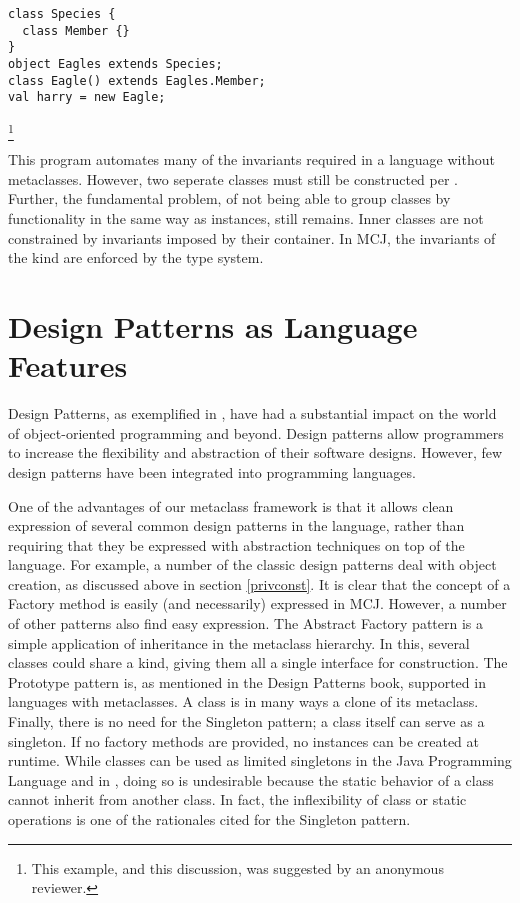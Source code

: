 \documentclass{acm-sigplan}
\begin{document}
\begin{verbatim}
class Species {
  class Member {}
}
object Eagles extends Species;
class Eagle() extends Eagles.Member;
val harry = new Eagle;
\end{verbatim}
\footnote{This example, and this discussion, was suggested by an
anonymous reviewer.}

This program automates many of the invariants required in a language
without metaclasses.  However, two seperate classes must still be
constructed per .  Further, the fundamental problem, of
not being able to group classes by functionality in the same way as
instances, still remains.  Inner classes are not constrained by
invariants imposed by their container.  In MCJ, the invariants of the
kind are enforced by the type system.  


\section{Design Patterns as Language Features}
\label{designpatterns}

Design Patterns, as exemplified in \cite{GOF}, have had a substantial
impact on the world of object-oriented programming and beyond.  Design
patterns allow programmers to increase the flexibility and abstraction
of their software designs.  However, few design patterns have been
integrated into programming languages.

One of the advantages of our metaclass framework is that it allows
clean expression of several common design patterns in the language,
rather than requiring that they be expressed with abstraction
techniques on top of the language.  For example, a number of the
classic design patterns deal with object creation, as discussed above
in section \ref{privconst}.  It is clear that the concept of a Factory
method is easily (and necessarily) expressed in MCJ.  However, a
number of other patterns also find easy expression.  The Abstract
Factory pattern is a simple application of inheritance in the
metaclass hierarchy.  In this, several classes could share a kind,
giving them all a single interface for construction. The Prototype
pattern is, as mentioned in the Design Patterns book, supported in
languages with metaclasses.  A class is in many ways a clone of its
metaclass.  Finally, there is no need for the Singleton pattern; a
class itself can serve as a singleton. If no factory methods are
provided, no instances can be created at runtime.  While classes can
be used as limited singletons in the Java Programming Language and in
\Cpp, doing so is undesirable because the static behavior of a class
cannot inherit from another class.  In fact, the inflexibility of
class or static operations is one of the rationales cited for the
Singleton pattern.
\end{document}
